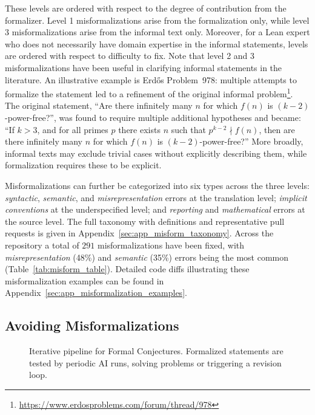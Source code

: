 These levels are ordered with respect to the degree of contribution from the formalizer.
Level 1 misformalizations arise from the formalization only, while level 3 misformalizations arise from the informal text only.
Moreover, for a Lean expert who does not necessarily have domain expertise in the informal statements, levels are ordered with respect to difficulty to fix.
Note that level 2 and 3 misformalizations have been useful in clarifying informal statements in the literature.
An illustrative example is Erd\H{o}s Problem~978: multiple attempts to formalize the statement led to a refinement of the original informal problem\footnote{\url{https://www.erdosproblems.com/forum/thread/978}}.
The original statement,
\enquote{Are there infinitely many $n$ for which $f(n)$ is $(k-2)$-power-free?},
was found to require multiple additional hypotheses and became:
\enquote{If $k>3$, and for all primes $p$ there exists $n$ such that $p^{k-2}\nmid f(n)$, then are there infinitely many $n$ for which $f(n)$ is $(k-2)$-power-free?}
More broadly, informal texts may exclude trivial cases without explicitly describing them, while formalization requires these to be explicit.

Misformalizations can further be categorized into six types across the three levels: \emph{syntactic}, \emph{semantic}, and \emph{misrepresentation} errors at the translation level; \emph{implicit conventions} at the underspecified level; and \emph{reporting} and \emph{mathematical} errors at the source level.
The full taxonomy with definitions and representative pull requests is given in Appendix~\ref{sec:app_misform_taxonomy}.
Across the repository a total of $291$ misformalizations have been fixed, with \emph{misrepresentation} (48\%) and \emph{semantic} (35\%) errors being the most common (Table~\ref{tab:misform_table}).
Detailed code diffs illustrating these misformalization examples can be found in Appendix~\ref{sec:app_misformalization_examples}.

\subsection{Avoiding Misformalizations}
\label{sec:avoiding_misform}

\begin{figure}[t!]
    \centering
    \resizebox{\textwidth}{!}{%
    }%
    \caption{Iterative pipeline for Formal Conjectures. Formalized statements are tested by periodic AI runs, solving problems or triggering a revision loop.}
    \label{fig:formalization_process}
\end{figure}

